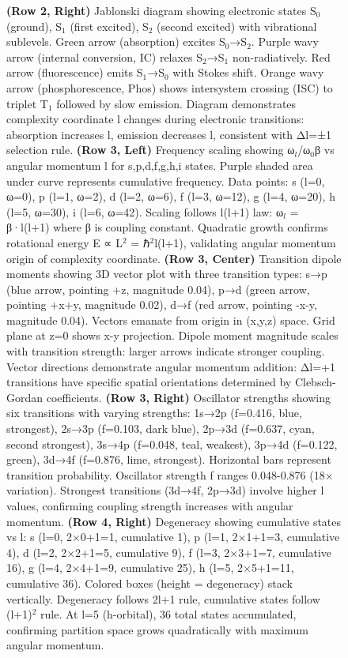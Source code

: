 \begin{figure}[htbp]
{    \textbf{(Row 2, Right)} Jablonski diagram showing electronic states S$_0$ (ground), S$_1$ (first excited), S$_2$ (second excited) with vibrational sublevels. Green arrow (absorption) excites S$_0$→S$_2$. Purple wavy arrow (internal conversion, IC) relaxes S$_2$→S$_1$ non-radiatively. Red arrow (fluorescence) emits S$_1$→S$_0$ with Stokes shift. Orange wavy arrow (phosphorescence, Phos) shows intersystem crossing (ISC) to triplet T$_1$ followed by slow emission. Diagram demonstrates complexity coordinate l changes during electronic transitions: absorption increases l, emission decreases l, consistent with Δl=±1 selection rule. 
    \textbf{(Row 3, Left)} Frequency scaling showing ω$_l$/ω$_0$β vs angular momentum l for s,p,d,f,g,h,i states. Purple shaded area under curve represents cumulative frequency. Data points: s (l=0, ω=0), p (l=1, ω=2), d (l=2, ω=6), f (l=3, ω=12), g (l=4, ω=20), h (l=5, ω=30), i (l=6, ω=42). Scaling follows l(l+1) law: ω$_l$ = β·l(l+1) where β is coupling constant. Quadratic growth confirms rotational energy E ∝ L$^2$ = ℏ$^2$l(l+1), validating angular momentum origin of complexity coordinate. 
    \textbf{(Row 3, Center)} Transition dipole moments showing 3D vector plot with three transition types: s→p (blue arrow, pointing +z, magnitude 0.04), p→d (green arrow, pointing +x+y, magnitude 0.02), d→f (red arrow, pointing -x-y, magnitude 0.04). Vectors emanate from origin in (x,y,z) space. Grid plane at z=0 shows x-y projection. Dipole moment magnitude scales with transition strength: larger arrows indicate stronger coupling. Vector directions demonstrate angular momentum addition: Δl=+1 transitions have specific spatial orientations determined by Clebsch-Gordan coefficients. 
    \textbf{(Row 3, Right)} Oscillator strengths showing six transitions with varying strengths: 1s→2p (f=0.416, blue, strongest), 2s→3p (f=0.103, dark blue), 2p→3d (f=0.637, cyan, second strongest), 3s→4p (f=0.048, teal, weakest), 3p→4d (f=0.122, green), 3d→4f (f=0.876, lime, strongest). Horizontal bars represent transition probability. Oscillator strength f ranges 0.048-0.876 (18× variation). Strongest transitions (3d→4f, 2p→3d) involve higher l values, confirming coupling strength increases with angular momentum. 
    \textbf{(Row 4, Right)} Degeneracy showing cumulative states vs l: s (l=0, 2×0+1=1, cumulative 1), p (l=1, 2×1+1=3, cumulative 4), d (l=2, 2×2+1=5, cumulative 9), f (l=3, 2×3+1=7, cumulative 16), g (l=4, 2×4+1=9, cumulative 25), h (l=5, 2×5+1=11, cumulative 36). Colored boxes (height = degeneracy) stack vertically. Degeneracy follows 2l+1 rule, cumulative states follow (l+1)$^2$ rule. At l=5 (h-orbital), 36 total states accumulated, confirming partition space grows quadratically with maximum angular momentum.}
    \label{fig:complexity_coordinate}
\end{figure}


